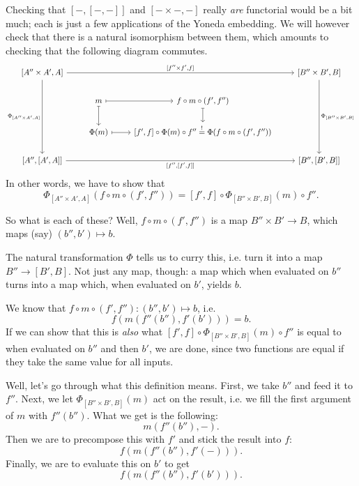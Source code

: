 \documentclass[a4paper,10pt]{scrreprt}
\theoremstyle{definition}
\theoremstyle{plain}
\theoremstyle{remark}
\begin{document}
Checking that $[-,[-,-]]$ and $[-\times-, -]$ really \emph{are} functorial would be a bit much; each is just a few applications of the Yoneda embedding. We will however check that there is a natural isomorphism between them, which amounts to checking that the following diagram commutes.
\begin{equation*}
  \begin{tikzcd}
    {[A'' \times A', A]}
    \arrow[rrr, "{[f'' \times f', f]}"]
    \arrow[ddd, swap, "{\Phi_{[A'' \times A', A]}}"]
    & & & {[B'' \times B', B]}
    \arrow[ddd, "{\Phi_{[B'' \times B', B]}}"]
    \\
    & m
    \arrow[d, mapsto]
    \arrow[r, mapsto]
    & f \circ m \circ (f', f'')
    \arrow[d, mapsto]
    \\
    & \Phi(m)
    \arrow[r, mapsto]
    & {[f', f] \circ \Phi(m) \circ f'' \stackrel{!}{=} \Phi(f \circ m \circ (f', f''))} 
    \\
    {[A'', [A', A]]}
    \arrow[rrr, swap, "{[f'', [f', f]]}"]
    & & & {[B'', [B', B]]}
  \end{tikzcd}
\end{equation*}
In other words, we have to show that 
\begin{equation*}
  \Phi_{[A'' \times A', A]}(f \circ m \circ (f', f'')) = [f', f] \circ \Phi_{[B'' \times B', B]}(m) \circ f''.
\end{equation*}

So what is each of these? Well, $f \circ m \circ (f', f'')$ is a map $B'' \times B' \to B$, which maps (say) $(b'', b') \mapsto b$. 

The natural transformation $\Phi$ tells us to curry this, i.e. turn it into a map $B'' \to [B', B]$. Not just any map, though: a map which when evaluated on $b''$ turns into a map which, when evaluated on $b'$, yields $b$.

We know that $f \circ m \circ (f', f'')\colon (b'', b') \mapsto b$, i.e.
\begin{equation*}
  f(m(f''(b''), f'(b'))) = b.
\end{equation*}
If we can show that this is \emph{also} what $[f', f] \circ \Phi_{[B'' \times B', B]}(m) \circ f''$ is equal to when evaluated on $b''$ and then $b'$, we are done, since two functions are equal if they take the same value for all inputs.

Well, let's go through what this definition means. First, we take $b''$ and feed it to $f''$. Next, we let $\Phi_{[B'' \times B', B]}(m)$ act on the result, i.e. we fill the first argument of $m$ with $f''(b'')$. What we get is the following:
\begin{equation*}
  m(f''(b''), -).
\end{equation*}
Then we are to precompose this with $f'$ and stick the result into $f$:
\begin{equation*}
  f(m(f''(b''), f'(-))).
\end{equation*}
Finally, we are to evaluate this on $b'$ to get
\begin{equation*}
  f(m(f''(b''), f'(b'))).
\end{equation*}
\end{document}
